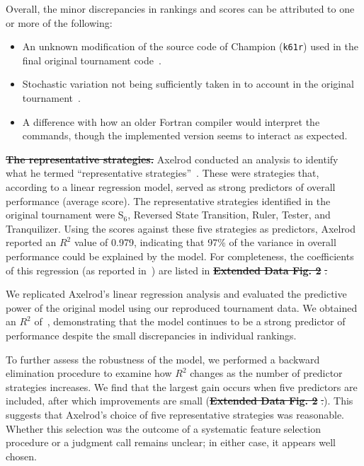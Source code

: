 \documentclass{article}
\providecommand{\DIFaddtex}[1]{{\protect\color{blue}\uwave{#1}}} %
\providecommand{\DIFdeltex}[1]{{\protect\color{red}\sout{#1}}}                      %
\providecommand{\DIFaddbegin}{} %
\providecommand{\DIFaddend}{} %
\providecommand{\DIFdelbegin}{} %
\providecommand{\DIFdelend}{} %
\providecommand{\DIFadd}[1]{\texorpdfstring{\DIFaddtex{#1}}{#1}} %
\providecommand{\DIFdel}[1]{\texorpdfstring{\DIFdeltex{#1}}{}} %
\newcommand{\DIFscaledelfig}{0.5}
\newlength{\DIFdelgraphicswidth} %
\newlength{\DIFdelgraphicsheight} %
\newcommand{\DIFaddincludegraphics}[2][]{{\color{blue}\fbox{\DIFOincludegraphics[#1]{#2}}}} %
\newcommand{\DIFdelincludegraphics}[2][]{%
\sbox{\DIFdelgraphicsbox}{\DIFOincludegraphics[#1]{#2}}%
\settoboxwidth{\DIFdelgraphicswidth}{\DIFdelgraphicsbox} %
\settoboxtotalheight{\DIFdelgraphicsheight}{\DIFdelgraphicsbox} %
\scalebox{\DIFscaledelfig}{%
\parbox[b]{\DIFdelgraphicswidth}{\usebox{\DIFdelgraphicsbox}\\[-\baselineskip] \rule{\DIFdelgraphicswidth}{0em}}\llap{\resizebox{\DIFdelgraphicswidth}{\DIFdelgraphicsheight}{%
\setlength{\unitlength}{\DIFdelgraphicswidth}%
\begin{picture}(1,1)%
\thicklines\linethickness{2pt} %
{\color[rgb]{1,0,0}\put(0,0){\framebox(1,1){}}}%
{\color[rgb]{1,0,0}\put(0,0){\line( 1,1){1}}}%
{\color[rgb]{1,0,0}\put(0,1){\line(1,-1){1}}}%
\end{picture}%
}\hspace*{3pt}}} %
} %
\DeclareRobustCommand{\DIFaddbegin}{\DIFOaddbegin \let\includegraphics\DIFaddincludegraphics} %
\DeclareRobustCommand{\DIFaddend}{\DIFOaddend \let\includegraphics\DIFOincludegraphics} %
\DeclareRobustCommand{\DIFdelbegin}{\DIFOdelbegin \let\includegraphics\DIFdelincludegraphics} %
\DeclareRobustCommand{\DIFdelend}{\DIFOaddend \let\includegraphics\DIFOincludegraphics} %
\begin{document}
Overall, the minor discrepancies in rankings and scores can be attributed to one
or more of the following:

\begin{itemize}
\item An unknown modification of the source code of Champion (\texttt{k61r})
used in the final original tournament code~\cite{Axelrod1980b}.
\item Stochastic variation not being sufficiently taken in to account in the
original tournament~\cite{Axelrod1980b}.
\item A difference with how an older Fortran compiler would interpret the
commands, though the implemented version seems to
interact as expected.
\end{itemize}

\DIFdelbegin %
\textbf{\DIFdel{The representative strategies.}}
\DIFdelend Axelrod conducted an analysis to identify what he termed ``representative
strategies''~\cite{Axelrod1980b}. These were strategies that, according to a
linear regression model, served as strong predictors of overall performance
(average score). The representative strategies identified in the original
tournament were S$_6$, Reversed State Transition, Ruler, Tester, and Tranquilizer.
Using the scores against these five strategies as predictors, Axelrod reported
an \(R^2\) value of 0.979,
indicating that 97\% of the variance in overall
performance could be explained by the model. For completeness, the coefficients
of this regression (as reported in~\cite{Axelrod1980b}) are listed in
\DIFdelbegin \textbf{\DIFdel{Extended Data Fig. 2}}%
\DIFdel{.
}\DIFdelend \DIFaddbegin \DIFadd{Supplementary Figure~2.
}\DIFaddend 

We replicated Axelrod's linear regression analysis and evaluated the predictive
power of the original model using our reproduced tournament data. We
obtained an \(R^2\) of~\unskip,
demonstrating that
the model continues to be a strong predictor of performance despite the small
discrepancies in individual rankings.

To further assess the robustness of the model, we performed a backward
elimination procedure to examine how \(R^2\) changes as the number of predictor
strategies increases. We find that the largest gain occurs when five predictors
are included, after which improvements are small (\DIFdelbegin \textbf{\DIFdel{Extended Data Fig. 2}}%
\DIFdel{.}\DIFdelend \DIFaddbegin \DIFadd{Supplementary Figure~2.}\DIFaddend ). This suggests that
Axelrod's choice of five representative strategies was reasonable. Whether this
selection was the outcome of a systematic feature selection procedure or a
judgment call remains unclear; in either case, it appears well chosen.\\
\end{document}
